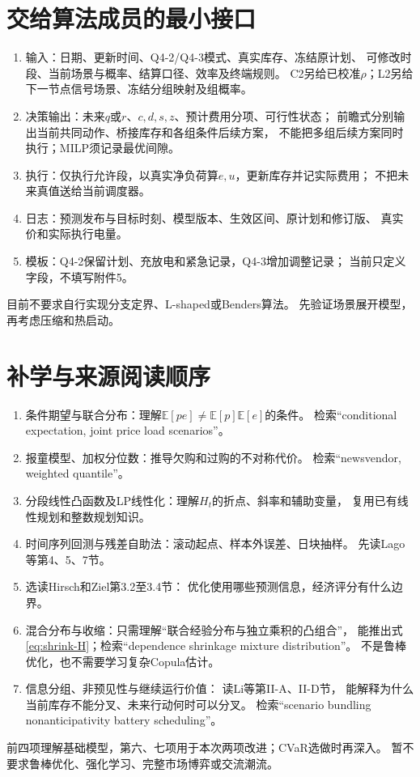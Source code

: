 \documentclass[UTF8,11pt]{ctexart}
\newcommand{\E}{\mathbb E}
\begin{document}
\section{交给算法成员的最小接口}
\begin{enumerate}
 \item 输入：日期、更新时间、Q4-2/Q4-3模式、真实库存、冻结原计划、
       可修改时段、当前场景与概率、结算口径、效率及终端规则。
       C2另给已校准$\rho$；L2另给下一节点信号场景、冻结分组映射及组概率。
 \item 决策输出：未来$q$或$r$、$c,d,s,z$、预计费用分项、可行性状态；
       前瞻式分别输出当前共同动作、桥接库存和各组条件后续方案，
       不能把多组后续方案同时执行；MILP须记录最优间隙。
 \item 执行：仅执行允许段，以真实净负荷算$e,u$，更新库存并记实际费用；
       不把未来真值送给当前调度器。
 \item 日志：预测发布与目标时刻、模型版本、生效区间、原计划和修订版、
       真实价和实际执行电量。
 \item 模板：Q4-2保留计划、充放电和紧急记录，Q4-3增加调整记录；
       当前只定义字段，不填写附件5。
\end{enumerate}
目前不要求自行实现分支定界、L-shaped或Benders算法。
先验证场景展开模型，再考虑压缩和热启动。

\section{补学与来源阅读顺序}
\begin{enumerate}
 \item 条件期望与联合分布：理解$\E[pe]\neq\E[p]\E[e]$的条件。
       检索“conditional expectation, joint price load scenarios”。
 \item 报童模型、加权分位数：推导欠购和过购的不对称代价。
       检索“newsvendor, weighted quantile”。
 \item 分段线性凸函数及LP线性化：理解$H_t$的折点、斜率和辅助变量，
       复用已有线性规划和整数规划知识。
 \item 时间序列回测与残差自助法：滚动起点、样本外误差、日块抽样。
       先读Lago等\cite{lago2021}第4、5、7节。
 \item 选读Hirsch和Ziel\cite{hirsch2026}第3.2至3.4节：
       优化使用哪些预测信息，经济评分有什么边界。
 \item 混合分布与收缩：只需理解“联合经验分布与独立乘积的凸组合”，
       能推出式\eqref{eq:shrink-H}；检索“dependence shrinkage mixture distribution”。
       不是鲁棒优化，也不需要学习复杂Copula估计。
 \item 信息分组、非预见性与继续运行价值：
       读Li等\cite{li2016}第II-A、II-D节，
       能解释为什么当前库存不能分叉、未来行动何时可以分叉。
       检索“scenario bundling nonanticipativity battery scheduling”。
\end{enumerate}
前四项理解基础模型，第六、七项用于本次两项改进；CVaR选做时再深入。
暂不要求鲁棒优化、强化学习、完整市场博弈或交流潮流。
\end{document}
